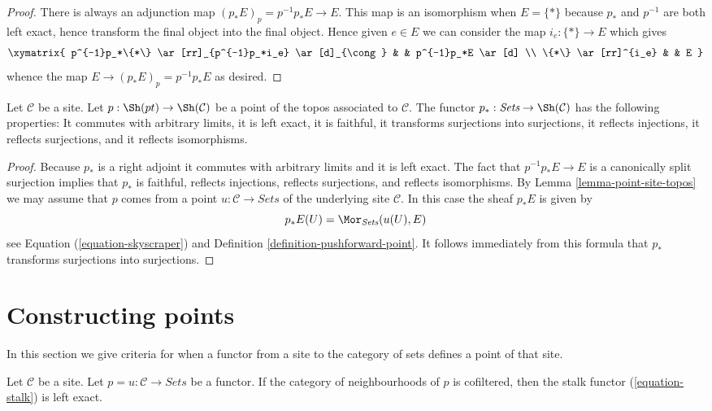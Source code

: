 \begin{proof}
There is always an adjunction map $(p_*E)_p = p^{-1}p_*E \to E$.
This map is an isomorphism when $E = \{*\}$ because $p_*$
and $p^{-1}$ are both left exact, hence transform the final
object into the final object. Hence given $e \in E$ we can consider
the map $i_e : \{*\} \to E$ which gives
$$
\xymatrix{
p^{-1}p_*\{*\} \ar[rr]_{p^{-1}p_*i_e} \ar[d]_{\cong} & & p^{-1}p_*E \ar[d] \\
\{*\} \ar[rr]^{i_e} & & E
}
$$
whence the map $E \to (p_*E)_p = p^{-1}p_*E$ as desired.
\end{proof}

\begin{lemma}
\label{lemma-skyscraper-functor-exact}
Let $\mathcal{C}$ be a site. Let
$p : \Sh(pt) \to \Sh(\mathcal{C})$ be a point of
the topos associated to $\mathcal{C}$.
The functor $p_* : \textit{Sets} \to \Sh(\mathcal{C})$
has the following properties: It commutes with arbitrary limits,
it is left exact, it is faithful, it transforms surjections into surjections,
it reflects injections, it reflects
surjections, and it reflects isomorphisms.
\end{lemma}

\begin{proof}
Because $p_*$ is a right adjoint it commutes with arbitrary limits and
it is left exact. The fact that $p^{-1}p_*E \to E$ is a canonically
split surjection implies that $p_*$ is faithful, reflects injections,
reflects surjections, and reflects isomorphisms. By
Lemma \ref{lemma-point-site-topos}
we may assume that $p$ comes from a point $u : \mathcal{C} \to \textit{Sets}$
of the underlying site $\mathcal{C}$. In this case the sheaf $p_*E$ is given by
$$
p_*E(U) = \Mor_{\textit{Sets}}(u(U), E)
$$
see Equation (\ref{equation-skyscraper}) and
Definition \ref{definition-pushforward-point}.
It follows immediately from this formula that $p_*$ transforms
surjections into surjections.
\end{proof}






\section{Constructing points}
\label{section-construct-points}

\noindent
In this section we give criteria for when a functor
from a site to the category of sets defines a point of that site.

\begin{lemma}
\label{lemma-neighbourhoods-cofiltered}
Let $\mathcal{C}$ be a site. Let $p = u : \mathcal{C} \to \textit{Sets}$
be a functor. If the category of neighbourhoods of $p$ is
cofiltered, then the stalk functor (\ref{equation-stalk})
is left exact.
\end{lemma}

